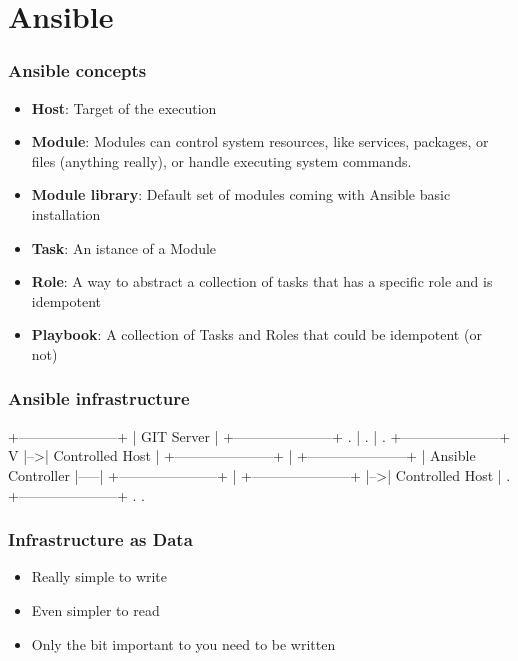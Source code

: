 \documentclass[t,aspectratio=169]{beamer}
\begin{document}
\section{Ansible}
\begin{frame}
    \frametitle{Ansible concepts}
    \begin{itemize}
        \item<2->\textbf{Host}: Target of the execution
        \item<3->\textbf{Module}: Modules can control system resources, like services, packages, or files (anything really), or handle executing system commands.
        \item<4->\textbf{Module library}: Default set of modules coming with Ansible basic installation
        \item<5->\textbf{Task}: An istance of a Module 
        \item<6->\textbf{Role}: A way to abstract a collection of tasks that has a specific role and is idempotent
        \item<7->\textbf{Playbook}: A collection of Tasks and Roles that could be idempotent (or not)
    \end{itemize}
\end{frame}

\begin{frame}[fragile]
    \frametitle{Ansible infrastructure}
    \begin{semiverbatim}
+---------------------+
|     GIT Server      |
+---------------------+     .
           |                .
           |                .   +---------------------+
           V                |-->|   Controlled Host   |
+---------------------+     |   +---------------------+
| Ansible Controller  |-----|
+---------------------+     |   +---------------------+
                            |-->|   Controlled Host   |
                            .   +---------------------+
                            .
                            .
    \end{semiverbatim}
\end{frame}

\begin{frame}
    \frametitle{Infrastructure as Data}
    \begin{itemize}
        \item<2-> Really simple to write
        \item<3-> Even simpler to read
        \item<4-> Only the bit important to you need to be written
    \end{itemize}
\end{frame}
\end{document}
